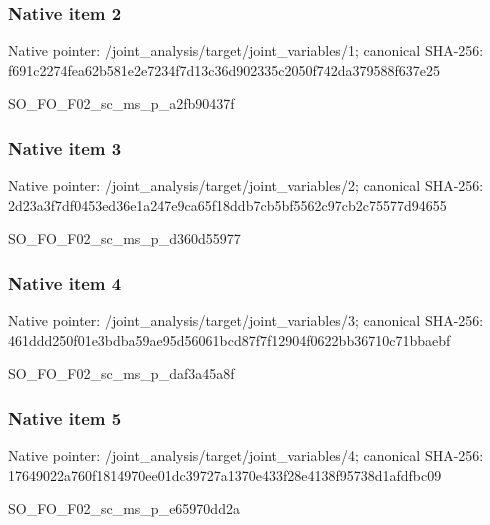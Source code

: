 \documentclass[10pt,a4paper]{article}
\begin{document}
\subsubsection{Native item 2}
Native pointer: /joint\_\allowbreak{}analysis/target/joint\_\allowbreak{}variables/1; canonical SHA-256: f691c2274fea62b581e2e7234f7d13c36d902335c2050f742da379588f637e25

\begingroup\raggedright\sloppy SO\_\allowbreak{}FO\_\allowbreak{}F02\_\allowbreak{}sc\_\allowbreak{}ms\_\allowbreak{}p\_\allowbreak{}a2fb90437f\par\endgroup

\subsubsection{Native item 3}
Native pointer: /joint\_\allowbreak{}analysis/target/joint\_\allowbreak{}variables/2; canonical SHA-256: 2d23a3f7df0453ed36e1a247e9ca65f18ddb7cb5bf5562c97cb2c75577d94655

\begingroup\raggedright\sloppy SO\_\allowbreak{}FO\_\allowbreak{}F02\_\allowbreak{}sc\_\allowbreak{}ms\_\allowbreak{}p\_\allowbreak{}d360d55977\par\endgroup

\subsubsection{Native item 4}
Native pointer: /joint\_\allowbreak{}analysis/target/joint\_\allowbreak{}variables/3; canonical SHA-256: 461ddd250f01e3bdba59ae95d56061bcd87f7f12904f0622bb36710c71bbaebf

\begingroup\raggedright\sloppy SO\_\allowbreak{}FO\_\allowbreak{}F02\_\allowbreak{}sc\_\allowbreak{}ms\_\allowbreak{}p\_\allowbreak{}daf3a45a8f\par\endgroup

\subsubsection{Native item 5}
Native pointer: /joint\_\allowbreak{}analysis/target/joint\_\allowbreak{}variables/4; canonical SHA-256: 17649022a760f1814970ee01dc39727a1370e433f28e4138f95738d1afdfbc09

\begingroup\raggedright\sloppy SO\_\allowbreak{}FO\_\allowbreak{}F02\_\allowbreak{}sc\_\allowbreak{}ms\_\allowbreak{}p\_\allowbreak{}e65970dd2a\par\endgroup
\end{document}
